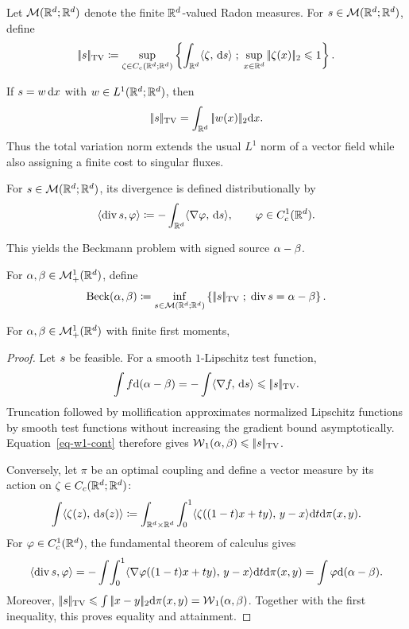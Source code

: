 \begin{defn}\label{def-vector-measure-tv}
	Let $\mathcal{M}(\mathbb{R}^d;\mathbb{R}^d)$ denote the finite $\mathbb{R}^d$-valued Radon measures. For $s\in\mathcal{M}(\mathbb{R}^d;\mathbb{R}^d)$, define
	\[
		|\!| s |\!|_{\operatorname{TV}}
		\coloneqq
		\sup_{\zeta\in C_c(\mathbb{R}^d;\mathbb{R}^d)}
		\left\{ \int_{\mathbb{R}^d}\langle \zeta,\,\mathrm{d}s\rangle \;;\; \sup_{x\in\mathbb{R}^d}|\!| \zeta(x) |\!|_2\leqslant1 \right\}.
	\]
\end{defn}

\begin{rem}\label{rem-vector-measure-tv-density}
	If $s=w\,\mathrm{d} x$ with $w\in L^1(\mathbb{R}^d;\mathbb{R}^d)$, then
	\[
		|\!| s |\!|_{\operatorname{TV}}
		=
		\int_{\mathbb{R}^d}|\!| w(x) |\!|_2\mathrm{d} x.
	\]
	Thus the total variation norm extends the usual $L^1$ norm of a vector field while also assigning a finite cost to singular fluxes.
\end{rem}

For $s\in\mathcal{M}(\mathbb{R}^d;\mathbb{R}^d)$, its divergence is defined distributionally by
\[
	\langle\operatorname{div}s,\varphi\rangle
	\coloneqq
	-\int_{\mathbb{R}^d}\langle \nabla\varphi,\,\mathrm{d}s\rangle,
	\qquad \varphi\in C_c^1(\mathbb{R}^d).
\]

This yields the Beckmann problem with signed source $\alpha-\beta$.
\begin{defn}\label{def-beckmann-problem}
For $\alpha,\beta\in\mathcal{M}_+^1(\mathbb{R}^d)$, define
\[
    \operatorname{Beck}(\alpha,\beta)
    \coloneqq
    \inf_{s\in\mathcal{M}(\mathbb{R}^d;\mathbb{R}^d)}
    \left\{ |\!| s |\!|_{\operatorname{TV}} \;;\; \operatorname{div}s=\alpha-\beta \right\}.
\]
\end{defn}

\begin{prop}\label{prop-euclidean-beckmann}
	For $\alpha,\beta\in\mathcal{M}_+^1(\mathbb{R}^d)$ with finite first moments,
\end{prop}
\begin{proof}
	Let $s$ be feasible. For a smooth $1$-Lipschitz test function,
	\[
		\int f\mathrm{d}(\alpha-\beta)
		=
		-\int\langle \nabla f,\,\mathrm{d}s\rangle
		\leqslant
		|\!| s |\!|_{\operatorname{TV}}.
	\]
	Truncation followed by mollification approximates normalized Lipschitz functions by smooth test functions without increasing the gradient bound asymptotically. Equation~\eqref{eq-w1-cont} therefore gives $\operatorname{\mathcal{W}}_1(\alpha,\beta)\leqslant|\!| s |\!|_{\operatorname{TV}}$.

	Conversely, let $\pi$ be an optimal coupling and define a vector measure by its action on $\zeta\in C_c(\mathbb{R}^d;\mathbb{R}^d)$:
	\[
		\int\langle \zeta(z),\,\mathrm{d}s(z)\rangle
		\coloneqq
		\int_{\mathbb{R}^d\times\mathbb{R}^d}\int_0^1
		\langle \zeta((1-t)x+ty),\,y-x\rangle\mathrm{d} t\mathrm{d}\pi(x,y).
	\]
	For $\varphi\in C_c^1(\mathbb{R}^d)$, the fundamental theorem of calculus gives
	\[
		\langle\operatorname{div}s,\varphi\rangle
		=
		-\int\!\int_0^1
		\langle \nabla\varphi((1-t)x+ty),\,y-x\rangle\mathrm{d} t\mathrm{d}\pi(x,y)
		=
		\int\varphi\mathrm{d}(\alpha-\beta).
	\]
	Moreover, $|\!| s |\!|_{\operatorname{TV}}\leqslant\int|\!| x-y |\!|_2\mathrm{d}\pi(x,y)=\operatorname{\mathcal{W}}_1(\alpha,\beta)$. Together with the first inequality, this proves equality and attainment.
\end{proof}

